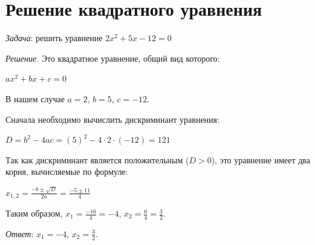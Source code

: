 \documentclass[12pt, letterpaper]{article}
\begin{document}
\section{Решение квадратного уравнения}
\textit{Задача}: решить уравнение \(2x^2 + 5x - 12 = 0\)

    \textit{Решение}. Это квадратное уравнение, общий вид которого:

\begin{center}

\(ax^2 + bx + c = 0\)

\end{center}
В нашем случае $a = 2$, $b = 5$, $c = -12$.

    Сначала необходимо вычислить дискриминант уравнения:

\begin{center}

\(D = b^2 - 4ac = (5)^2 - 4 \cdot 2 \cdot (-12) = 121\)

\end{center}
Так как дискриминант является положительным ($D > 0$), это уравнение
имеет два корня, вычисляемые по формуле:

\begin{center}

\(x_{1,2} = \displaystyle\frac{-b \pm \sqrt{D}}{2a} = \frac{-5 \pm 11}{4}\)

\end{center}
Таким образом, $x_1 = \frac{-16}{4} = -4$, $x_2 = \frac{6}{4} = \frac{3}{2}$.

    \textit{Ответ}: $x_1 = -4$, $x_2 = \frac{3}{2}$.
\end{document}

